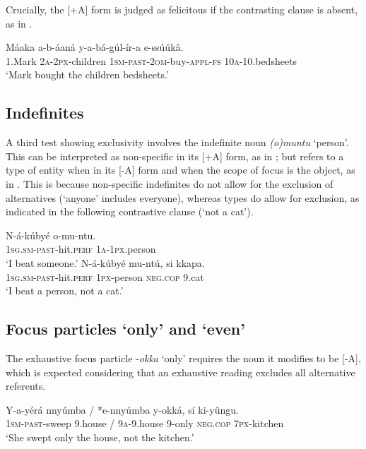 \documentclass[output=paper]{langsci/langscibook}
\begin{document}
Crucially, the [+A] form is judged as felicitous if the contrasting clause is absent, as in .

\ea\label{ex:vanderwal:29}
\gll   Máaka  a-b-áaná    y-a-bá-gúl-ír-a      e-ssúúkâ.\\
       1.Mark  \textsc{2a}-\textsc{2px}-children  \textsc{1sm}-\textsc{past}-\textsc{2om}-buy-\textsc{appl}-\textsc{fs}  \textsc{10a}-10.bedsheets\\
\glt   ‘Mark bought the children bedsheets.’
\z

\subsection{Indefinites}\label{sec:vanderwal:4.3} %

A third test showing exclusivity involves the indefinite noun \textit{(o)muntu} ‘person’. This can be interpreted as non-specific in its [+A] form, as in ; but refers to a type of entity when in its [-A] form and when the scope of focus is the object, as in . This is because non-specific indefinites do not allow for the exclusion of alternatives (‘anyone’ includes everyone), whereas types do allow for exclusion, as indicated in the following contrastive clause (‘not a cat’).

\ea\label{ex:vanderwal:30}
\ea\label{ex:vanderwal:30a}
\gll     N-á-kúbyé      o-mu-ntu.\\
         \textsc{1sg}.\textsc{sm}-\textsc{past}-hit.\textsc{perf}  \textsc{1a}-\textsc{1px}.person\\
\glt     ‘I beat someone.’
\ex\label{ex:vanderwal:30b}
\gll     N-á-kúbyé      mu-ntú,  si    kkapa.\\
         \textsc{1sg}.\textsc{sm}-\textsc{past}-hit.\textsc{perf}  \textsc{1px}-person  \textsc{neg.cop}  9.cat\\
\glt     ‘I beat a person, not a cat.’
\z
\z

\subsection{Focus particles ‘only’ and ‘even’}\label{sec:vanderwal:4.3} %

The exhaustive focus particle -\textit{okka} ‘only’ requires the noun it modifies to be [-A], which is expected considering that an exhaustive reading excludes all alternative referents.

\ea\label{ex:vanderwal:31}
\gll   Y-a-yérá    nnyúmba /  *e-nnyúmba  y-okká,  sí    ki-yûngu.\\
       \textsc{1sm}-\textsc{past}-sweep  9.house /  \textsc{9a}-9.house  9-only  \textsc{neg}.\textsc{cop}  \textsc{7px}-kitchen\\
\glt ‘She swept only the house, not the kitchen.’
\z
\end{document}
